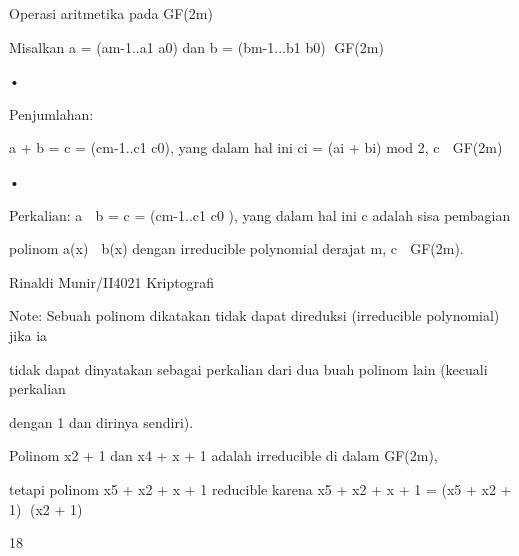 \documentclass{article}
\begin{document}

Operasi aritmetika pada GF(2m) 

 Misalkan a = (am-1..a1 a0) dan b = (bm-1...b1 b0) GF(2m) 

•

Penjumlahan:  


    a + b = c = (cm-1..c1 c0), yang dalam hal ini ci = (ai + bi) mod 2, c  GF(2m) 

•

Perkalian: a  b = c = (cm-1..c1 c0 ), yang dalam hal ini c adalah sisa pembagian 

polinom a(x)  b(x) dengan irreducible polynomial derajat m,  c  GF(2m).

Rinaldi Munir/II4021 Kriptografi

Note: Sebuah polinom dikatakan tidak dapat direduksi (irreducible polynomial) jika ia 

tidak dapat dinyatakan sebagai perkalian dari dua buah polinom lain  (kecuali perkalian 

dengan 1 dan dirinya sendiri).

Polinom x2 + 1 dan x4 + x + 1 adalah irreducible di dalam GF(2m),

 tetapi polinom  x5 + x2 + x + 1 reducible karena  x5 + x2 + x + 1 = (x5 + x2 + 1) (x2 + 1)

18
\end{document}
